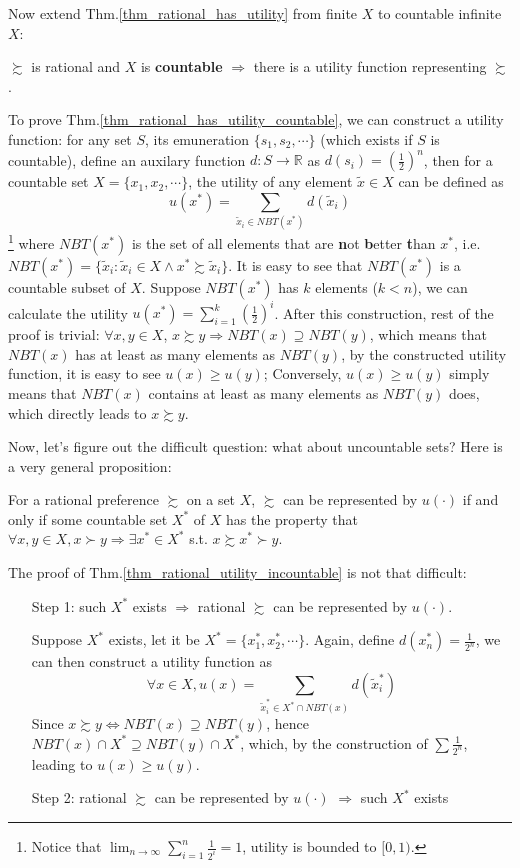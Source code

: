 Now extend Thm.\ref{thm_rational_has_utility} from finite $X$ to countable infinite $X$:
\begin{theorem}\label{thm_rational_has_utility_countable}
    $\succsim$ is rational and $X$ is \textbf{countable} $\Rightarrow$ there is a utility function representing $\succsim$.
\end{theorem}

To prove Thm.\ref{thm_rational_has_utility_countable}, we can construct a utility function: for any set $S$, its emuneration $\{s_1,s_2,\cdots\}$ (which exists if $S$ is countable), define an auxilary function $d:S\rightarrow \mathbb{R}$ as $d(s_i)=\left(\frac{1}{2}\right)^n$, then for a countable set $X=\{x_1,x_2,\cdots\}$, the utility of any element $\tilde{x}\in X$ can be defined as 
$$u(x^*)=\sum_{\tilde{x}_i\in NBT(x^*)}d(\tilde{x}_i)$$\footnote{Notice that $\lim_{n\rightarrow\infty}\sum_{i=1}^n\frac{1}{2^i}=1$, utility is bounded to $[0,1)$.}
where $NBT(x^*)$ is the set of all elements that are \textbf{n}ot \textbf{b}etter \textbf{t}han $x^*$, i.e. $NBT(x^*)=\{\tilde{x}_i:\tilde{x}_i\in X \land x^*\succsim \tilde{x}_i\}$. It is easy to see that $NBT(x^*)$ is a countable subset of $X$. Suppose $NBT(x^*)$ has $k$ elements ($k<n$), we can calculate the utility $u(x^*)=\sum_{i=1}^k\left(\frac{1}{2}\right)^i$. After this construction,
rest of the proof is trivial: $\forall x,y\in X$, $x\succsim y\Rightarrow NBT(x)\supseteq NBT(y)$, which means that $NBT(x)$ has at least as many elements as $NBT(y)$, by the constructed utility function, it is easy to see $u(x)\geq u(y)$; Conversely, $u(x)\geq u(y)$ simply means that $NBT(x)$ contains at least as many elements as $NBT(y)$ does, which directly leads to $x\succsim y$.

Now, let's figure out the difficult question: what about uncountable sets? Here is a very general proposition:
\begin{theorem}\label{thm_rational_utility_incountable}
    For a rational preference $\succsim$ on a set $X$, $\succsim$ can be represented by $u(\cdot)$ if and only if some countable set $X^*$ of $X$ has the property that $\forall x,y\in X, x\succ y\Rightarrow \exists x^*\in X^*$ s.t. $x\succsim x^*\succ y$.
\end{theorem}
The proof of Thm.\ref{thm_rational_utility_incountable} is not that difficult:
\begin{enumerate}
    \item[Step 1:] such $X^*$ exists $\Rightarrow$ rational $\succsim$ can be represented by $u(\cdot)$.

    Suppose $X^*$ exists, let it be $X^*=\{x_1^*,x_2^*,\cdots\}$. Again, define $d(x_n^*)=\frac{1}{2^n}$, we can then construct a utility function as 
    $$\forall x\in X, u(x)=\sum_{\tilde{x}_i^*\in X^*\cap NBT(x)}d(\tilde{x}^*_i)$$
    Since $x\succsim y\Leftrightarrow NBT(x)\supseteq NBT(y)$, hence $NBT(x)\cap X^*\supseteq NBT(y)\cap X^*$, which, by the construction of $\sum\frac{1}{2^n}$, leading to $u(x)\geq u(y)$.
    \item[Step 2:] rational $\succsim$ can be represented by $u(\cdot)$ $\Rightarrow$ such $X^*$ exists
\end{enumerate}

